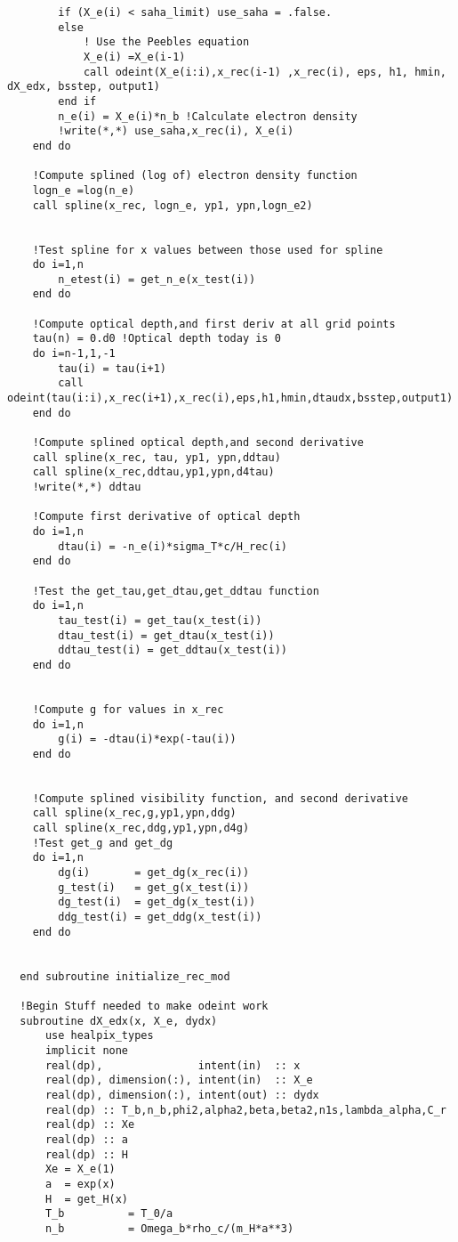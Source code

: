 \documentclass{aa}   %
\begin{document}
\begin{verbatim}
        if (X_e(i) < saha_limit) use_saha = .false.
        else
            ! Use the Peebles equation
            X_e(i) =X_e(i-1)
            call odeint(X_e(i:i),x_rec(i-1) ,x_rec(i), eps, h1, hmin, dX_edx, bsstep, output1) 
        end if
        n_e(i) = X_e(i)*n_b !Calculate electron density
        !write(*,*) use_saha,x_rec(i), X_e(i)
    end do

    !Compute splined (log of) electron density function
    logn_e =log(n_e)
    call spline(x_rec, logn_e, yp1, ypn,logn_e2)


    !Test spline for x values between those used for spline
    do i=1,n  
        n_etest(i) = get_n_e(x_test(i))
    end do

    !Compute optical depth,and first deriv at all grid points
    tau(n) = 0.d0 !Optical depth today is 0
    do i=n-1,1,-1
        tau(i) = tau(i+1)
        call odeint(tau(i:i),x_rec(i+1),x_rec(i),eps,h1,hmin,dtaudx,bsstep,output1)
    end do

    !Compute splined optical depth,and second derivative
    call spline(x_rec, tau, yp1, ypn,ddtau)
    call spline(x_rec,ddtau,yp1,ypn,d4tau)
    !write(*,*) ddtau
 
    !Compute first derivative of optical depth
    do i=1,n
        dtau(i) = -n_e(i)*sigma_T*c/H_rec(i)
    end do
   
    !Test the get_tau,get_dtau,get_ddtau function
    do i=1,n
        tau_test(i) = get_tau(x_test(i))
        dtau_test(i) = get_dtau(x_test(i))
        ddtau_test(i) = get_ddtau(x_test(i))
    end do

    
    !Compute g for values in x_rec
    do i=1,n
        g(i) = -dtau(i)*exp(-tau(i))
    end do


    !Compute splined visibility function, and second derivative
    call spline(x_rec,g,yp1,ypn,ddg)
    call spline(x_rec,ddg,yp1,ypn,d4g)
    !Test get_g and get_dg
    do i=1,n
        dg(i)       = get_dg(x_rec(i))
        g_test(i)   = get_g(x_test(i))
        dg_test(i)  = get_dg(x_test(i))
        ddg_test(i) = get_ddg(x_test(i))
    end do


  end subroutine initialize_rec_mod

  !Begin Stuff needed to make odeint work
  subroutine dX_edx(x, X_e, dydx) 
      use healpix_types
      implicit none
      real(dp),               intent(in)  :: x
      real(dp), dimension(:), intent(in)  :: X_e
      real(dp), dimension(:), intent(out) :: dydx
      real(dp) :: T_b,n_b,phi2,alpha2,beta,beta2,n1s,lambda_alpha,C_r
      real(dp) :: Xe
      real(dp) :: a
      real(dp) :: H 
      Xe = X_e(1)
      a  = exp(x)
      H  = get_H(x)
      T_b          = T_0/a
      n_b          = Omega_b*rho_c/(m_H*a**3)


\end{verbatim}
\end{document}
